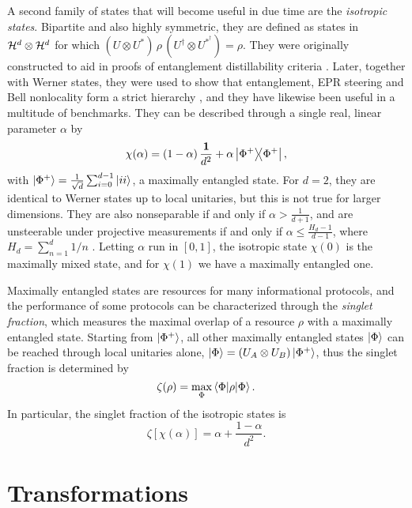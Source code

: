 		A second family of states that will become useful in due time are the \emph{isotropic states}. Bipartite and also highly symmetric, they are defined as states in $\mathcal{H}^{d} \otimes \mathcal{H}^{d}$ for which $(U \otimes U^*) \,\rho\, (U^\dagger \otimes U^{*^\dagger}) = \rho$. They were originally constructed to aid in proofs of entanglement distillability criteria \cite{horodecki_1999_isotropic}. Later, together with Werner states, they were used to show that entanglement, EPR steering and Bell nonlocality form a strict hierarchy \cite{wiseman_2007_steering,quintino_2015_inequivalence}, and they have likewise been useful in a multitude of benchmarks. They can be described through a single real, linear parameter $\alpha$ by
		$$
			\chi(\alpha) = \left(1 - \alpha\right) \frac{\mathbf{1}}{d^2} + \alpha \ketbra{\Phi^+}{\Phi^+} ,
		$$
		with $\ket{\Phi^+} = \frac{1}{\sqrt{d}} \sum_{i = 0}^{d - 1} \ket{ii}$, a maximally entangled state. For $d = 2$, they are identical to Werner states up to local unitaries, but this is not true for larger dimensions. They are also nonseparable if and only if $\alpha > \frac{1}{d+1}$, and are unsteerable under projective measurements if and only if $\alpha \leq \frac{H_d - 1}{d-1}$, where $H_d = \sum_{n=1}^d 1/n$ \cite{wiseman_2007_steering}. Letting $\alpha$ run in $[0,1]$, the isotropic state $\chi(0)$ is the maximally mixed state, and for $\chi(1)$ we have a maximally entangled one.
	
		Maximally entangled states are resources for many informational protocols, and the performance of some protocols can be characterized through the \emph{singlet fraction}, which measures the maximal overlap of a resource $\rho$ with a maximally entangled state. Starting from $\ket{\Phi^+}$, all other maximally entangled states $\ket{\Phi}$ can be reached through local unitaries alone, $\ket{\Phi} = (U_A \otimes U_B) \ket{\Phi^+}$, thus the singlet fraction is determined by
		$$
			\zeta(\rho) = \max_\Phi \left\langle \Phi \middle\vert \rho \middle\vert \Phi \right\rangle .
		$$
		In particular, the singlet fraction of the isotropic states is
		$$
			\zeta\left[ \chi(\alpha) \right] = \alpha + \frac{1 - \alpha}{d^2} .
		$$

	\section{Transformations}

